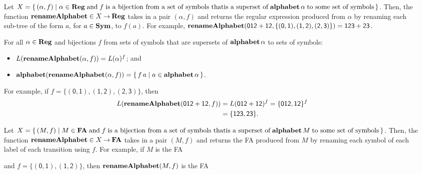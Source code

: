 Let $X=\{ \, (\alpha,f) \mid \alpha\in\mathbf{Reg}\;\allowbreak\mbox{and}\allowbreak\;f\;\allowbreak\mbox{is a
bijection from a set of symbols that}\allowbreak\allowbreak\mbox{is a superset
of}\allowbreak\;\mathbf{alphabet}\,\alpha\;\allowbreak\mbox{to some set of symbols}\allowbreak \, \}$.
Then, the function $\mathbf{renameAlphabet}\in X\mathbin{\to}\mathbf{Reg}$ takes in a pair
$(\alpha,f)$ and
%
%
%
returns the regular expression produced from $\alpha$ by renaming each
sub-tree of the form $a$, for $a\in\mathbf{Sym}$, to $f(a)$.
For example, $\mathbf{renameAlphabet}(\mathsf{012+12},
\mathsf{\{(0, 1), (1, 2), (2, 3)\}}) =
\mathsf{123+23}$.

\begin{theorem}
For all $\alpha\in\mathbf{Reg}$ and bijections $f$ from sets of symbols that
are supersets of $\mathbf{alphabet}\,\alpha$ to sets of symbols:
\begin{itemize}
\item $L(\mathbf{renameAlphabet}(\alpha,f)) = L(\alpha)^f$; and

\item $\mathbf{alphabet}(\mathbf{renameAlphabet}(\alpha,f)) =
\{ \, f\,a \mid a\in\mathbf{alphabet}\,\alpha \, \}$.
\end{itemize}
\end{theorem}

For example, if $f=\mathsf{\{(0, 1), (1, 2), (2, 3)\}}$, then
\begin{align*}
L(\mathbf{renameAlphabet}(\mathsf{012+12}, f)) &=
L(\mathsf{012+12})^f=\{\mathsf{012,12}\}^f \\
&= \{\mathsf{123,23}\} .
\end{align*}

Let $X=\{ \, (M,f) \mid M\in\mathbf{FA}\;\allowbreak\mbox{and}\allowbreak\;f\;\allowbreak\mbox{is a
bijection from a set of symbols that}\allowbreak\allowbreak\mbox{is a superset
of}\allowbreak\;\mathbf{alphabet}\,M\;\allowbreak\mbox{to some set of symbols}\allowbreak \, \}$.
Then, the function $\mathbf{renameAlphabet}\in X\mathbin{\to}\mathbf{FA}$ takes in a pair $(M,f)$ and
%
%
%
%
%
%
%
%
%
returns the FA produced from $M$ by renaming each symbol of each
label of each transition using $f$.
For example, if $M$ is the FA
\begin{center}

\end{center}
and $f=\{\mathsf{(0,1), (1,2)}\}$, then
$\mathbf{renameAlphabet}(M,f)$ is the FA
\begin{center}

\end{center}


